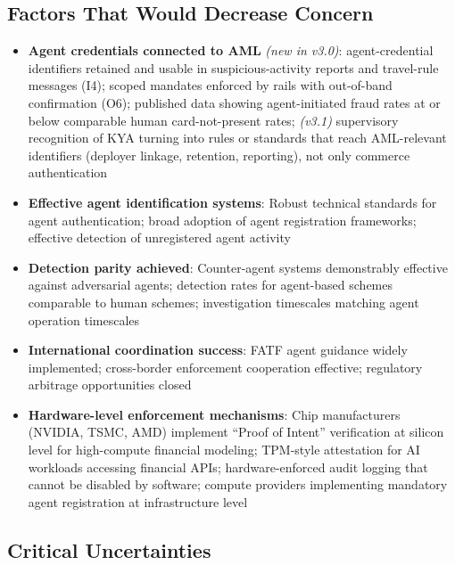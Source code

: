 \documentclass[11pt,letterpaper]{article}
\begin{document}
\subsection{Factors That Would Decrease Concern}

\begin{itemize}
  \item \textbf{Agent credentials connected to AML} \textit{(new in v3.0)}: agent-credential identifiers retained and usable in suspicious-activity reports and travel-rule messages (I4); scoped mandates enforced by rails with out-of-band confirmation (O6); published data showing agent-initiated fraud rates at or below comparable human card-not-present rates; \textit{(v3.1)} supervisory recognition of KYA turning into rules or standards that reach AML-relevant identifiers (deployer linkage, retention, reporting), not only commerce authentication
  \item \textbf{Effective agent identification systems}: Robust technical standards for agent authentication; broad adoption of agent registration frameworks; effective detection of unregistered agent activity
  \item \textbf{Detection parity achieved}: Counter-agent systems demonstrably effective against adversarial agents; detection rates for agent-based schemes comparable to human schemes; investigation timescales matching agent operation timescales
  \item \textbf{International coordination success}: FATF agent guidance widely implemented; cross-border enforcement cooperation effective; regulatory arbitrage opportunities closed
  \item \textbf{Hardware-level enforcement mechanisms}: Chip manufacturers (NVIDIA, TSMC, AMD) implement ``Proof of Intent'' verification at silicon level for high-compute financial modeling; TPM-style attestation for AI workloads accessing financial APIs; hardware-enforced audit logging that cannot be disabled by software; compute providers implementing mandatory agent registration at infrastructure level
\end{itemize}

\subsection{Critical Uncertainties}
\end{document}
